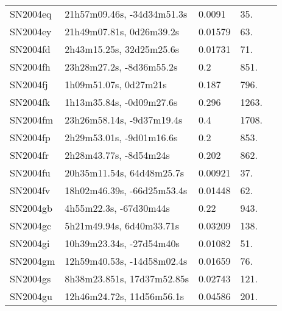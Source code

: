 \begin{longtable}{lllll}
         SN2004eq &     21h57m09.46s, -34d34m51.3s &   0.0091 &            35. &    \citet{20032dF...C...0000C} \\
         SN2004ey &       21h49m07.81s, 0d26m39.2s &  0.01579 &            63. &    \citet{2006HIPAS.C...0000:} \\
         SN2004fd &       2h43m15.25s, 32d25m25.6s &  0.01731 &            71. &    \citet{1991RC3.9.C...0000d} \\
         SN2004fh &       23h28m27.2s, -8d36m55.2s &      0.2 &           851. &    \citet{2004IAUC.8427A...1F} \\
         SN2004fj &          1h09m51.07s, 0d27m21s &    0.187 &           796. &    \citet{2007ApJ...666..674M} \\
         SN2004fk &       1h13m35.84s, -0d09m27.6s &    0.296 &          1263. &    \citet{2007ApJ...666..674M} \\
         SN2004fm &      23h26m58.14s, -9d37m19.4s &      0.4 &          1708. &    \citet{2004IAUC.8427A...1F} \\
         SN2004fp &       2h29m53.01s, -9d01m16.6s &      0.2 &           853. &    \citet{2004IAUC.8427A...1F} \\
         SN2004fr &         2h28m43.77s, -8d54m24s &    0.202 &           862. &    \citet{2007ApJ...666..674M} \\
         SN2004fu &      20h35m11.54s, 64d48m25.7s &  0.00921 &            37. &  \citet{1998AandAS..130..333T} \\
         SN2004fv &     18h02m46.39s, -66d25m53.4s &  0.01448 &            62. &    \citet{2006HIPAS.C...0000:} \\
         SN2004gb &         4h55m22.3s, -67d30m44s &     0.22 &           943. &    \citet{2004IAUC.8439B...1G} \\
         SN2004gc &       5h21m49.94s, 6d40m33.71s &  0.03209 &           138. &    \citet{1992ApJ...399..353H} \\
         SN2004gi &       10h39m23.34s, -27d54m40s &  0.01082 &            51. &  \citet{1989AandAS...77..237R} \\
         SN2004gm &     12h59m40.53s, -14d58m02.4s &  0.01659 &            76. &    \citet{1992AJ....103...11F} \\
         SN2004gs &     8h38m23.851s, 17d37m52.85s &  0.02743 &           121. &    \citet{2007SDSS6.C...0000:} \\
         SN2004gu &      12h46m24.72s, 11d56m56.1s &  0.04586 &           201. &    \citet{2006SDSS5.C...0000:} \\

\end{longtable}
